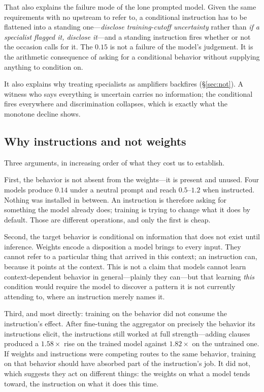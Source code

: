 \documentclass[11pt]{article}
\begin{document}
That also explains the failure mode of the lone prompted model. Given the same
requirements with no upstream to refer to, a conditional instruction has to be
flattened into a standing one---\emph{disclose training-cutoff uncertainty}
rather than \emph{if a specialist flagged it, disclose it}---and a standing
instruction fires whether or not the occasion calls for it. The $0.15$ is not
a failure of the model's judgement. It is the arithmetic consequence of asking
for a conditional behavior without supplying anything to condition on.

It also explains why treating specialists as amplifiers backfires
(\S\ref{sec:not}). A witness who says everything is uncertain carries no
information; the conditional fires everywhere and discrimination collapses,
which is exactly what the monotone decline shows.

\subsection{Why instructions and not weights}
Three arguments, in increasing order of what they cost us to establish.

First, the behavior is not absent from the weights---it is present and unused.
Four models produce $0.14$ under a neutral prompt and reach $0.5$--$1.2$ when
instructed. Nothing was installed in between. An instruction is therefore
asking for something the model already does; training is trying to change what
it does by default. Those are different operations, and only the first is
cheap.

Second, the target behavior is conditional on information that does not exist
until inference. Weights encode a disposition a model brings to every input.
They cannot refer to a particular thing that arrived in this context; an
instruction can, because it points at the context. This is not a claim that
models cannot learn context-dependent behavior in general---plainly they
can---but that learning \emph{this} condition would require the model to
discover a pattern it is not currently attending to, where an instruction
merely names it.

Third, and most directly: training on the behavior did not consume the
instruction's effect. After fine-tuning the aggregator on precisely the
behavior its instructions elicit, the instructions still worked at full
strength---adding clauses produced a $1.58\times$ rise on the trained model
against $1.82\times$ on the untrained one. If weights and instructions were
competing routes to the same behavior, training on that behavior should have
absorbed part of the instruction's job. It did not, which suggests they act on
different things: the weights on what a model tends toward, the instruction on
what it does this time.
\end{document}
